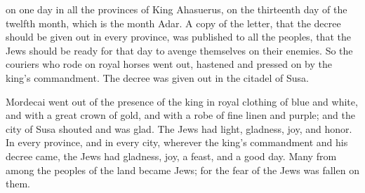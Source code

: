 {on one day in all the provinces of King Ahasuerus, on the thirteenth day of the twelfth month, which is the month Adar.
A copy of the letter, that the decree should be given out in every province, was published to all the peoples, that the Jews should be ready for that day to avenge themselves on their enemies.
So the couriers who rode on royal horses went out, hastened and pressed on by the king’s commandment. The decree was given out in the citadel of Susa.
\par }{\PP {}Mordecai went out of the presence of the king in royal clothing of blue and white, and with a great crown of gold, and with a robe of fine linen and purple; and the city of Susa shouted and was glad.
The Jews had light, gladness, joy, and honor.
In every province, and in every city, wherever the king’s commandment and his decree came, the Jews had gladness, joy, a feast, and a good day. Many from among the peoples of the land became Jews; for the fear of the Jews was fallen on them.

}

